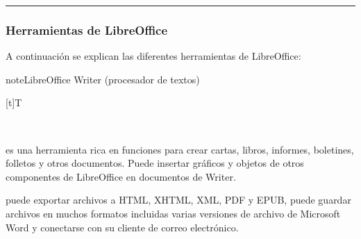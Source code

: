 \documentclass[letterpaper,10pt,spanish]{sphinxmanual}
\let\sphinxpxdimen\pdfpxdimen\else\newdimen\sphinxpxdimen
\begin{document}
\bigskip\hrule\bigskip



\subsubsection{Herramientas de LibreOffice}
\label{\detokenize{1_guias/10ofimatica/G1012:herramientas-de-libreoffice}}
\sphinxAtStartPar
\sphinxfootnotemark[16] A continuación se explican las diferentes herramientas de LibreOffice:

\begin{sphinxadmonition}{note}{LibreOffice Writer (procesador de textos)}


\begin{savenotes}\sphinxattablestart
\sphinxthistablewithglobalstyle
\centering
\begin{tabulary}{\linewidth}[t]{T}
\sphinxtoprule
\sphinxtableatstartofbodyhook

\begin{sphinxfigure-in-table}
\centering
\capstart
\noindent\sphinxincludegraphics[width=270\sphinxpxdimen]{{image141}.png}
\label{\detokenize{1_guias/10ofimatica/G1012:id54}}\end{sphinxfigure-in-table}\relax
\\
\sphinxbottomrule
\end{tabulary}
\sphinxtableafterendhook\par
\sphinxattableend\end{savenotes}

\sphinxAtStartPar
{} es una herramienta rica en funciones para crear cartas, libros, informes, boletines, folletos y otros documentos. Puede insertar gráficos y objetos de otros componentes de LibreOffice en documentos de Writer.

\sphinxAtStartPar
{} puede exportar archivos a HTML, XHTML, XML, PDF y EPUB, puede guardar archivos en muchos formatos incluidas varias versiones de archivo de Microsoft Word y conectarse con su cliente de correo electrónico.
\end{sphinxadmonition}
\end{document}
